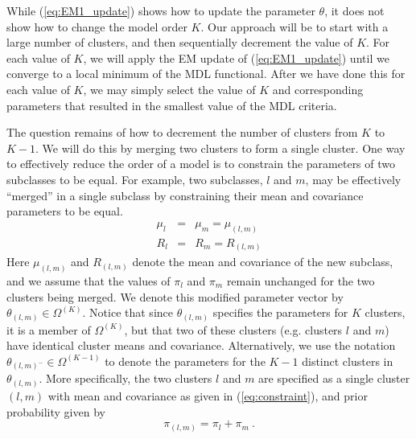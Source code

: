 \documentclass[12pt]{article}
\begin{document}
While (\ref{eq:EM1_update}) shows how to update the parameter $\theta$,
it does not show how to change the model order $K$.
Our approach will be to start with a large number of clusters,
and then sequentially decrement the value of $K$.
For each value of $K$, we will apply the EM update of (\ref{eq:EM1_update})
until we converge to a local minimum of the MDL functional.
After we have done this for each value of $K$, we may simply
select the value of $K$ and corresponding parameters
that resulted in the smallest value of the MDL criteria.

The question remains of how to decrement the number of clusters
from $K$ to $K-1$. 
We will do this by merging two clusters to form a single cluster.
One way to effectively reduce the order 
of a model is to constrain the parameters
of two subclasses to be equal.
For example, two subclasses, $l$ and $m$, may be effectively
``merged'' in a single subclass by constraining their mean and covariance
parameters to be equal.
\begin{eqnarray}
\label{eq:constraint}
\mu_l &=&  \mu_m = \mu_{(l,m)} \\
\nonumber
R_l &=&  R_m = R_{(l,m)} 
\end{eqnarray}
Here $\mu_{(l,m)}$ and $R_{(l,m)}$ denote the mean and covariance
of the new subclass,
and we assume that the values of $\pi_l$ and $\pi_m$ remain unchanged
for the two clusters being merged.
We denote this modified parameter vector by $\theta_{(l,m)} \in \Omega^{(K)}$.
Notice that since 
$\theta_{(l,m)}$ specifies the parameters for $K$ clusters,
it is a member of $\Omega^{(K)}$, 
but that two of these clusters (e.g. clusters $l$ and $m$)
have identical cluster means and covariance.
Alternatively, we use the notation $\theta_{(l,m)^-} \in \Omega^{(K-1)}$
to denote the parameters for the $K-1$ distinct clusters
in $\theta_{(l,m)}$.
More specifically, the two clusters $l$ and $m$ are specified
as a single cluster $(l,m)$ with mean and covariance 
as given in (\ref{eq:constraint}), and
prior probability given by
\begin{equation}
\pi_{(l,m)} = \pi_l+\pi_m \ .
\label{eq:newprior}
\end{equation}
\end{document}
